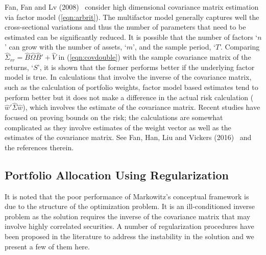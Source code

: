 Fan, Fan and Lv (2008)~\cite{fansq} consider high dimensional covariance matrix estimation via factor model (\ref{eqn:arbrit}). The multifactor model generally captures well the cross-sectional variations and thus the number of parameters that need to be estimated can be significantly reduced. It is possible that the number of factors `$n$' can grow with the number of assets, `$m$', and the sample period, `$T$'. Comparing $\hat{\Sigma}_{rr}= \hat{B} \hat{\Omega} \hat{B}' + \hat{V}$ in (\ref{eqn:covdouble}) with the sample covariance matrix of the returns, `$S$', it is shown that the former performs better if the underlying factor model is true. In calculations that involve the inverse of the covariance matrix, such as the calculation of portfolio weights, factor model based estimates tend to perform better but it does not make a difference in the actual risk calculation ($\hat{w}' \hat{\Sigma} \hat{w}$), which involves the estimate of the covariance matrix. Recent studies have focused on proving bounds on the risk; the calculations are somewhat complicated as they involve estimates of the weight vector as well as the estimates of the covariance matrix. See Fan, Han, Liu and Vickers (2016)~\cite{vickers} and the references therein. 



\subsection{Portfolio Allocation Using Regularization}


It is noted that the poor performance of Markowitz's conceptual framework is due to the structure of the optimization problem. It is an ill-conditioned inverse problem as the solution requires the inverse of the covariance matrix that may involve highly correlated securities. A number of regularization procedures have been proposed in the literature to address the instability in the solution and we present a few of them here. \\


